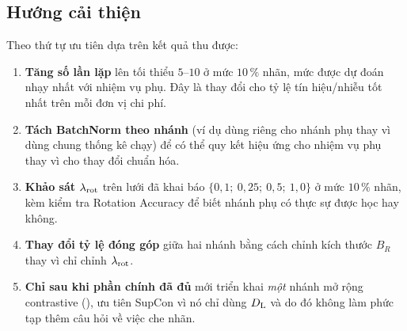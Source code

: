 \subsection{Hướng cải thiện}
\label{sec:disc-next}

Theo thứ tự ưu tiên dựa trên kết quả thu được:

\begin{enumerate}[leftmargin=1.2cm,itemsep=3pt]
  \item \textbf{Tăng số lần lặp} lên tối thiểu $5$--$10$ ở mức $10\,\%$ nhãn, mức được dự đoán
        nhạy nhất với nhiệm vụ phụ. Đây là thay đổi cho tỷ lệ tín hiệu/nhiễu tốt nhất trên mỗi
        đơn vị chi phí.
  \item \textbf{Tách BatchNorm theo nhánh} (ví dụ dùng  riêng cho nhánh phụ thay vì
        dùng chung thống kê chạy) để có thể quy kết hiệu ứng cho nhiệm vụ phụ thay vì cho thay
        đổi chuẩn hóa.
  \item \textbf{Khảo sát $\lambda_{\mathrm{rot}}$} trên lưới đã khai báo $\{0{,}1;\ 0{,}25;\ 0{,}5;\ 1{,}0\}$
        ở mức $10\,\%$ nhãn, kèm kiểm tra Rotation Accuracy để biết nhánh phụ có thực sự được
        học hay không.
  \item \textbf{Thay đổi tỷ lệ đóng góp} giữa hai nhánh bằng cách chỉnh kích thước $B_R$ thay
        vì chỉ chỉnh $\lambda_{\mathrm{rot}}$.
  \item \textbf{Chỉ sau khi phần chính đã đủ} mới triển khai \emph{một} nhánh mở rộng contrastive
        (), ưu tiên SupCon vì nó chỉ dùng $D_{\mathrm{L}}$ và do đó không làm phức
        tạp thêm câu hỏi về việc che nhãn.
\end{enumerate}

